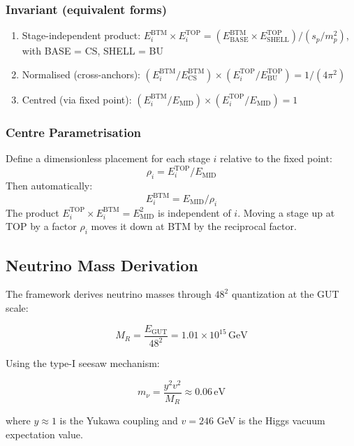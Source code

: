 \documentclass[11pt,a4paper]{article}
\theoremstyle{definition}
\theoremstyle{remark}
\begin{document}
\subsubsection{Invariant (equivalent forms)}
\begin{enumerate}
\item Stage-independent product: $E_i^{\mathrm{BTM}} \times E_i^{\mathrm{TOP}} = (E_{\mathrm{BASE}}^{\mathrm{BTM}} \times E_{\mathrm{SHELL}}^{\mathrm{TOP}}) / (s_p/m_p^2)$, with BASE = CS, SHELL = BU
\item Normalised (cross-anchors): $(E_i^{\mathrm{BTM}} / E_{\mathrm{CS}}^{\mathrm{BTM}}) \times (E_i^{\mathrm{TOP}} / E_{\mathrm{BU}}^{\mathrm{TOP}}) = 1 / (4\pi^2)$
\item Centred (via fixed point): $(E_i^{\mathrm{BTM}} / E_{\mathrm{MID}}) \times (E_i^{\mathrm{TOP}} / E_{\mathrm{MID}}) = 1$
\end{enumerate}

\subsubsection{Centre Parametrisation}
Define a dimensionless placement for each stage $i$ relative to the fixed point:
\[
\rho_i = E_i^{\mathrm{TOP}} / E_{\mathrm{MID}}
\]
Then automatically:
\[
E_i^{\mathrm{BTM}} = E_{\mathrm{MID}} / \rho_i
\]
The product $E_i^{\mathrm{TOP}} \times E_i^{\mathrm{BTM}} = E_{\mathrm{MID}}^2$ is independent of $i$. Moving a stage up at TOP by a factor $\rho_i$ moves it down at BTM by the reciprocal factor.

\subsection{Neutrino Mass Derivation}

The framework derives neutrino masses through $48^2$ quantization at the GUT scale:

\begin{equation}
M_R = \frac{E_{\mathrm{GUT}}}{48^2} = 1.01 \times 10^{15} \, \mathrm{GeV}
\end{equation}

Using the type-I seesaw mechanism:

\begin{equation}
m_\nu = \frac{y^2 v^2}{M_R} \approx 0.06 \, \mathrm{eV}
\end{equation}

where $y \approx 1$ is the Yukawa coupling and $v = 246$ GeV is the Higgs vacuum expectation value.
\end{document}
